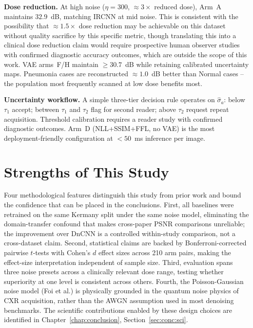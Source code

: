 \documentclass[12pt, a4paper, twoside, openright]{book}
\begin{document}
\textbf{Dose reduction.} At high noise ($\eta=300$, $\approx 3\times$ reduced dose), Arm~A maintains $32.9$~dB, matching IRCNN at mid noise. This is consistent with the possibility that $\approx1.5\times$ dose reduction may be achievable on this dataset without quality sacrifice by this specific metric, though translating this into a clinical dose reduction claim would require prospective human observer studies with confirmed diagnostic accuracy outcomes, which are outside the scope of this work. VAE arms~F/H maintain $\geq 30.7$~dB while retaining calibrated uncertainty maps. Pneumonia cases are reconstructed $\approx 1.0$~dB better than Normal cases -- the population most frequently scanned at low dose benefits most.

\textbf{Uncertainty workflow.} A simple three-tier decision rule operates on $\hat{\sigma}_a$: below $\tau_1$ accept; between $\tau_1$ and $\tau_2$ flag for second reader; above $\tau_2$ request repeat acquisition. Threshold calibration requires a reader study with confirmed diagnostic outcomes. Arm~D (NLL+SSIM+FFL, no VAE) is the most deployment-friendly configuration at $<50$~ms inference per image.

\section{Strengths of This Study}
\label{sec:disc:strengths}

Four methodological features distinguish this study from prior work and bound the confidence that can be placed in the conclusions. First, all baselines were retrained on the same Kermany split under the same noise model, eliminating the domain-transfer confound that makes cross-paper PSNR comparisons unreliable; the improvement over DnCNN is a controlled within-study comparison, not a cross-dataset claim. Second, statistical claims are backed by Bonferroni-corrected pairwise $t$-tests with Cohen's $d$ effect sizes across 210 arm pairs, making the effect-size interpretation independent of sample size. Third, evaluation spans three noise presets across a clinically relevant dose range, testing whether superiority at one level is consistent across others. Fourth, the Poisson-Gaussian noise model (Foi et al.) is physically grounded in the quantum noise physics of CXR acquisition, rather than the AWGN assumption used in most denoising benchmarks. The scientific contributions enabled by these design choices are identified in Chapter~\ref{chap:conclusion}, Section~\ref{sec:conc:sci}.
\end{document}
